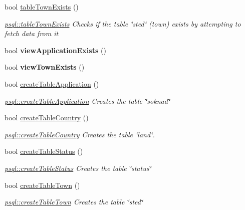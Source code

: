 \begin{DoxyCompactItemize}
bool \mbox{\hyperlink{classpsql_a717162b7d7faa0fb41b5a526e42de4ac}{table\+Town\+Exists}} ()
\begin{DoxyCompactList}\small\item\em \mbox{\hyperlink{classpsql_a717162b7d7faa0fb41b5a526e42de4ac}{psql\+::table\+Town\+Exists}} Checks if the table \char`\"{}sted\char`\"{} (town) exists by attempting to fetch data from it \end{DoxyCompactList}\item 
\mbox{\label{classpsql_a4c23d467c41e155a55c38b1cefb9b54b}} 
bool {\bfseries view\+Application\+Exists} ()
\item 
\mbox{\label{classpsql_aae95eb2a505c1b0b7b4d5671926ecd2f}} 
bool {\bfseries view\+Town\+Exists} ()
\item 
bool \mbox{\hyperlink{classpsql_a36f6a197a2214b9c71cfcd620334835d}{create\+Table\+Application}} ()
\begin{DoxyCompactList}\small\item\em \mbox{\hyperlink{classpsql_a36f6a197a2214b9c71cfcd620334835d}{psql\+::create\+Table\+Application}} Creates the table \char`\"{}soknad\char`\"{} \end{DoxyCompactList}\item 
bool \mbox{\hyperlink{classpsql_ab6e496d8471f3cd9c5c082a6ba75c25b}{create\+Table\+Country}} ()
\begin{DoxyCompactList}\small\item\em \mbox{\hyperlink{classpsql_ab6e496d8471f3cd9c5c082a6ba75c25b}{psql\+::create\+Table\+Country}} Creates the table \char`\"{}land\char`\"{}. \end{DoxyCompactList}\item 
bool \mbox{\hyperlink{classpsql_a427ad0f483c8ab7a4d23912278bc69e8}{create\+Table\+Status}} ()
\begin{DoxyCompactList}\small\item\em \mbox{\hyperlink{classpsql_a427ad0f483c8ab7a4d23912278bc69e8}{psql\+::create\+Table\+Status}} Creates the table \char`\"{}status\char`\"{} \end{DoxyCompactList}\item 
bool \mbox{\hyperlink{classpsql_a95d1f522766174bd2c6a7b94f725719c}{create\+Table\+Town}} ()
\begin{DoxyCompactList}\small\item\em \mbox{\hyperlink{classpsql_a95d1f522766174bd2c6a7b94f725719c}{psql\+::create\+Table\+Town}} Creates the table \char`\"{}sted\char`\"{} \end{DoxyCompactList}\item 

\end{DoxyCompactItemize}
